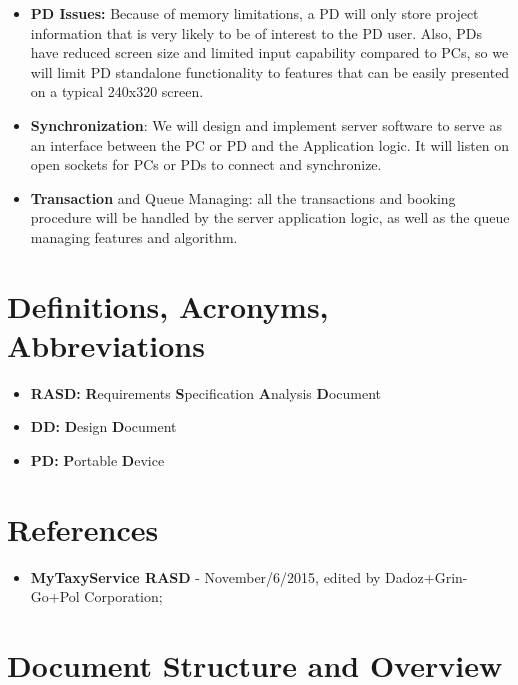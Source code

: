 \documentclass[10pt,a4paper]{report}
\begin{document}
\begin{itemize}
\item \textbf{PD Issues:} Because of memory limitations, a PD will only store project information that is very likely to be of interest to the PD user. Also, PDs have reduced screen size and limited input capability compared to PCs, so we will limit PD standalone functionality to features that can be easily presented on a typical 240x320 screen.

\item \textbf{Synchronization}: We will design and implement server software to serve as an interface between the PC or PD and the Application logic. It will listen on open sockets for PCs or PDs to connect and synchronize.

\item \textbf{Transaction} and Queue Managing: all the transactions and booking procedure will be handled by the server application logic, as well as the queue managing features and algorithm.
\end{itemize}

\section{Definitions, Acronyms, Abbreviations}
\begin{itemize}
\item{\textbf{RASD:}} \textbf{R}equirements \textbf{S}pecification \textbf{A}nalysis \textbf{D}ocument
\item{\textbf{DD:}} \textbf{D}esign \textbf{D}ocument
\item{\textbf{PD:}} \textbf{P}ortable \textbf{D}evice
\end{itemize}
\section{References}
\begin{itemize}
\item{\textbf{MyTaxyService RASD}} - November/6/2015, edited by Dadoz+Grin-Go+Pol Corporation;
\end{itemize}
\section{Document Structure and Overview}
\end{document}
